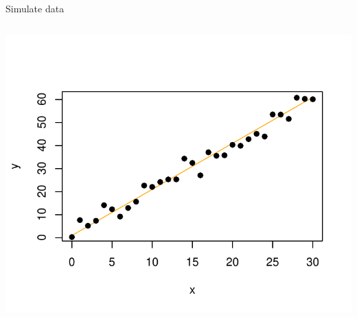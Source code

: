\documentclass[
  ignorenonframetext,
  aspectratio=169]{beamer}
\begin{document}
\begin{frame}[fragile]{Simulate data}
\begin{columns}[T]
\begin{column}{0.5\textwidth}
\includegraphics{03-Lecture_files/figure-beamer/unnamed-chunk-5-1.pdf}
\end{column}
\end{columns}
\end{frame}
\end{document}
